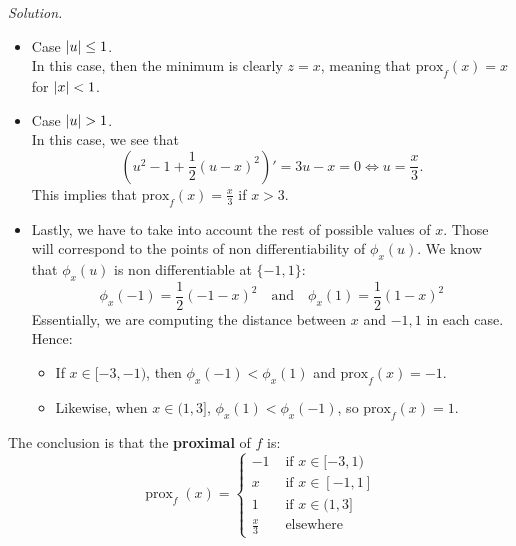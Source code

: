 \documentclass[a4paper]{article}
\DeclarePairedDelimiter\abs{\lvert}{\rvert}%
\newenvironment{solution}
    {\textit{Solution.}\\}
    {}
\begin{document}
\begin{solution}
  \begin{itemize}
    \item Case \(\abs{u} \leq 1\).\\
          In this case, then the minimum is clearly \(z = x\), meaning that \(\text{prox}_f(x) = x\) for \(\abs{x}<1\).

    \item Case \(\abs{u} > 1\).\\
          In this case, we see that
          \[
            \left(u^2 - 1 + \frac{1}{2}(u-x)^2\right)' = 3u - x = 0 \Longleftrightarrow u = \frac{x}{3}.
          \]
          This implies that \(\text{prox}_f(x) = \frac{x}{3}\) if \(x > 3\).

    \item Lastly, we have to take into account the rest of possible values of \(x\). Those will correspond to the points of non differentiability of \(\phi_x(u)\). We know that \(\phi_x(u)\) is non differentiable at \(\{-1,1\}\):
          \[
            \phi_x(-1) = \frac{1}{2}(-1-x)^2 \quad \text{and} \quad \phi_x(1) = \frac{1}{2}(1-x)^2
          \]
          Essentially, we are computing the distance between \(x\) and \(-1,1\) in each case. Hence:
          \begin{itemize}
            \item  If \(x \in [-3,-1)\),  then \(\phi_x(-1) < \phi_x(1)\) and \(\text{prox}_f(x) = -1 \).
            \item Likewise, when \(x \in (1,3]\), \(\phi_x(1) < \phi_x(-1)\), so \(\text{prox}_f(x) = 1\).
          \end{itemize}
  \end{itemize}

  The conclusion is that the \textbf{proximal} of \(f\) is:
  \[
    \operatorname{prox}_f(x) = \begin{cases}
      -1          & \text{ if } x \in [-3,1) \\
      x           & \text{ if } x \in [-1,1] \\
      1           & \text{ if } x \in (1,3]  \\
      \frac{x}{3} & \text{ elsewhere }
    \end{cases}
  \]
\end{solution}
\end{document}
